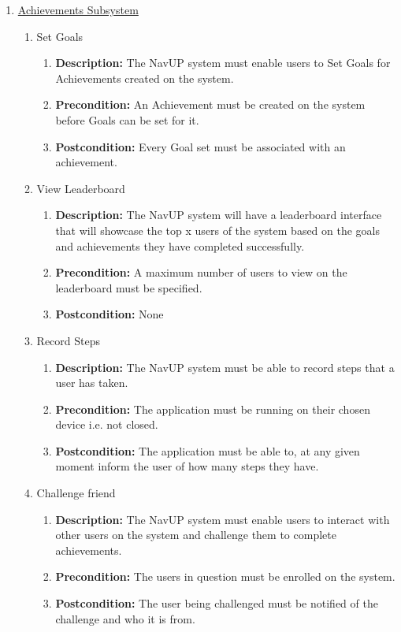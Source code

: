 \documentclass{article}
\begin{document}
\begin{enumerate}
	\item \underline{Achievements Subsystem}
	
		\begin{enumerate}	
			
		\item Set Goals
		\begin{enumerate}
			\item \textbf{Description:} The NavUP system must enable users to Set Goals for Achievements created on the system. 
			\item \textbf{Precondition:} An Achievement must be created on the system before Goals can be set for it. 
			\item \textbf{Postcondition:} Every Goal set must be associated with an achievement. 			
		\end{enumerate}
		
		\item View Leaderboard
		\begin{enumerate}
			\item \textbf{Description:} The NavUP system will have a leaderboard interface that will showcase the top x users of the system based on the goals and achievements they have completed successfully. 
			\item \textbf{Precondition:} A maximum number of users to view on the leaderboard must be specified. 
			\item \textbf{Postcondition:} None			
			
		\end{enumerate}
		
		\item Record Steps
		\begin{enumerate}
			\item \textbf{Description:} The NavUP system must be able to record steps that a user has taken. 
			\item \textbf{Precondition:} The application must be running on their chosen device i.e. not closed.
			\item \textbf{Postcondition:} The application must be able to, at any given moment inform the user of how many steps they have.
			
		\end{enumerate}
		
		\item Challenge friend
		\begin{enumerate}
			\item \textbf{Description:} The NavUP system must enable users to interact with other users on the system and challenge them to complete achievements. 
			\item \textbf{Precondition:} The users in question must be enrolled on the system. 
			\item \textbf{Postcondition:} The user being challenged must be notified of the challenge and who it is from. \newline					
			

\end{enumerate}
\end{enumerate}
\end{enumerate}
\end{document}
